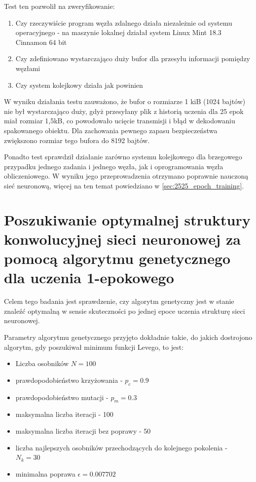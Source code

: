 Test ten pozwolił na zweryfikowanie:
\begin{enumerate}
  \item Czy rzeczywiście program węzła zdalnego działa niezależnie od systemu operacyjnego - na maszynie lokalnej działał system Linux Mint 18.3 Cinnamon 64 bit
  \item Czy zdefiniowano wystarczająco duży bufor dla przesyłu informacji pomiędzy węzłami
  \item Czy system kolejkowy działa jak powinien
\end{enumerate}

W wyniku działania testu zauważono, że bufor o rozmiarze 1 kiB (1024 bajtów) nie był wystarczająco duży, gdyż przesyłany plik z historią uczenia dla 25 epok miał rozmiar 1,5kB, co powodowało ucięcie transmisji i błąd w dekodowaniu spakowanego obiektu.
Dla zachowania pewnego zapasu bezpieczeństwa zwiększono rozmiar tego bufora do 8192 bajtów.

Ponadto test sprawdził działanie zarówno systemu kolejkowego dla brzegowego przypadku jednego zadania i jednego węzła, jak i oprogramowania węzła obliczeniowego.
W wyniku jego przeprowadzenia otrzymano poprawnie nauczoną sieć neuronową, więcej na ten temat powiedziano w \ref{sec:2525_epoch_training}.

\section{Poszukiwanie optymalnej struktury konwolucyjnej sieci neuronowej za pomocą algorytmu genetycznego dla uczenia 1-epokowego}\label{sec:actual_experiment}
Celem tego badania jest sprawdzenie, czy algorytm genetyczny jest w stanie znaleźć optymalną w sensie skuteczności po jednej epoce uczenia strukturę sieci neuronowej.

Parametry algorytmu genetycznego przyjęto dokładnie takie, do jakich dostrojono algorytm, gdy poszukiwał minimum funkcji Levego, to jest:
\begin{itemize}
  \item Liczba osobników $N = 100$
  \item prawdopodobieństwo krzyżowania - $p_{c} = 0.9$
  \item prawdopodobieństwo mutacji - $p_{m} = 0.3$
  \item maksymalna liczba iteracji - 100
  \item maksymalna liczba iteracji bez poprawy - 50
  \item liczba najlepszych osobników przechodzących do kolejnego pokolenia - $ N_{k} = 30$
  \item minimalna poprawa $\epsilon = 0.007702$
\end{itemize}

